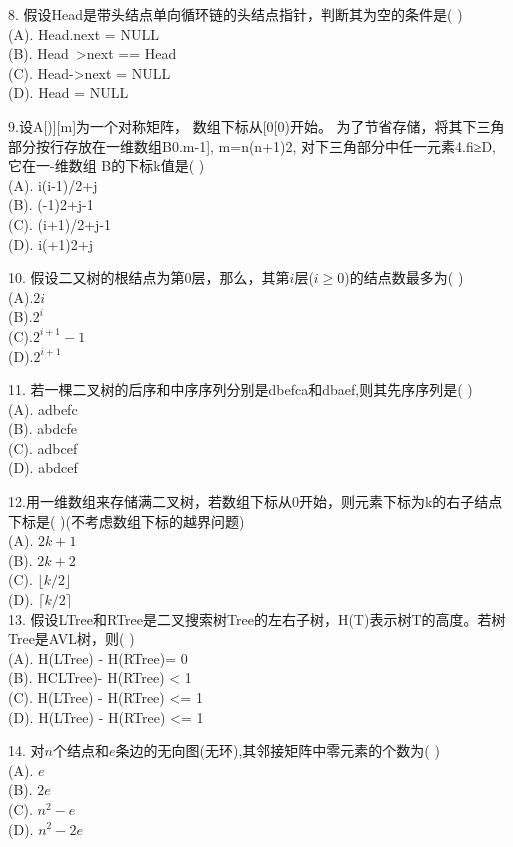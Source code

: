 8. 假设Head是带头结点单向循环链的头结点指针，判断其为空的条件是( ) \\
(A). Head.next = NULL \\
(B). Head~>next == Head \\
(C). Head->next = NULL \\
(D). Head = NULL

9.设A[)][m]为一个对称矩阵， 数组下标从[0[0)开始。 为了节省存储，将其下三角部分按行存放在一维数组B0.m-1], m=n(n+1)2, 对下三角部分中任一元素4.fi≥D, 它在一-维数组 B的下标k值是( ) \\
(A). i(i-1)/2+j \\
(B). (-1)2+j-1 \\
(C). (i+1)/2+j-1 \\
(D). i(+1)2+j

10. 假设二又树的根结点为第$0$层，那么，其第$i$层($i\geqslant0$)的结点数最多为( ) \\
(A).$2i$ \\
(B).$2^i$ \\
(C).$2^{i+1}-1$ \\
(D).$2^{i+1}$

11. 若一棵二叉树的后序和中序序列分别是dbefca和dbaef,则其先序序列是( ) \\
(A). adbefc \\
(B). abdcfe \\
(C). adbcef \\
(D). abdcef

12.用一维数组来存储满二叉树，若数组下标从0开始，则元素下标为k的右子结点下标是( )(不考虑数组下标的越界问题) \\
(A). $2k+1$ \\
(B). $2k+2$ \\
(C). $ \lfloor k/2 \rfloor $ \\
(D). $ \lceil k/2 \rceil $ \\

13. 假设LTree和RTree是二叉搜索树Tree的左右子树，H(T)表示树T的高度。若树Tree是AVL树，则( ) \\
(A). H(LTree) - H(RTree)= 0 \\
(B). HCLTree)- H(RTree) < 1 \\
(C). H(LTree) - H(RTree) <= 1 \\
(D). H(LTree) - H(RTree) <= 1

14. 对$n$个结点和$e$条边的无向图(无环),其邻接矩阵中零元素的个数为( ) \\
(A). $e$ \\
(B). $2e$  \\
(C). $n^2-e$ \\
(D). $n^2-2e$

